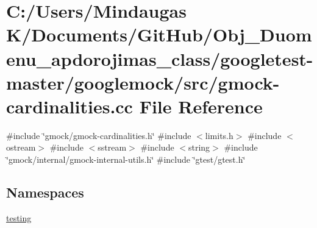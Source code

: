 \hypertarget{googletest-master_2googlemock_2src_2gmock-cardinalities_8cc}{}\section{C\+:/\+Users/\+Mindaugas K/\+Documents/\+Git\+Hub/\+Obj\+\_\+\+Duomenu\+\_\+apdorojimas\+\_\+class/googletest-\/master/googlemock/src/gmock-\/cardinalities.cc File Reference}
\label{googletest-master_2googlemock_2src_2gmock-cardinalities_8cc}
{\ttfamily \#include \char`\"{}gmock/gmock-\/cardinalities.\+h\char`\"{}}\newline
{\ttfamily \#include $<$limits.\+h$>$}\newline
{\ttfamily \#include $<$ostream$>$}\newline
{\ttfamily \#include $<$sstream$>$}\newline
{\ttfamily \#include $<$string$>$}\newline
{\ttfamily \#include \char`\"{}gmock/internal/gmock-\/internal-\/utils.\+h\char`\"{}}\newline
{\ttfamily \#include \char`\"{}gtest/gtest.\+h\char`\"{}}\newline
\subsection*{Namespaces}
\begin{DoxyCompactItemize}
\item 
 \mbox{\hyperlink{namespacetesting}{testing}}
\end{DoxyCompactItemize}
